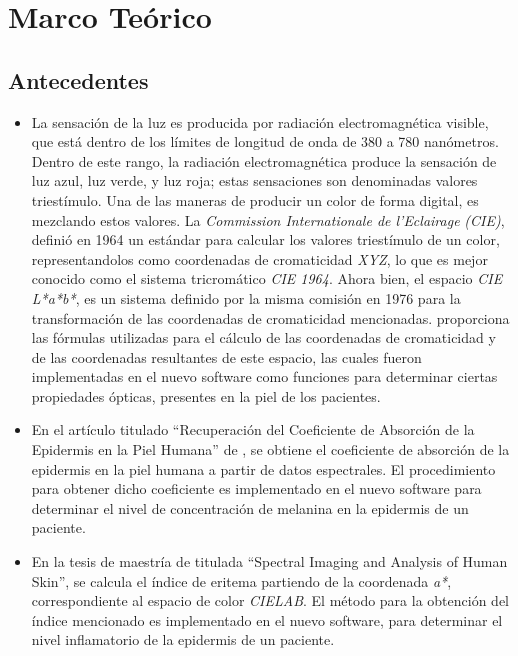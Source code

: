 \chapter{\label{cap:2}Marco Te\'{o}rico}

	\section{Antecedentes}	
		\begin{itemize}
		
			\item
				La sensaci\'{o}n de la luz es producida por radiaci\'{o}n electromagn\'{e}tica visible, que est\'{a} dentro de los l\'{i}mites de longitud de onda de 380 a 780 nan\'{o}metros. Dentro de este rango, la radiaci\'{o}n electromagn\'{e}tica produce la sensaci\'{o}n de luz azul, luz verde, y luz roja; estas sensaciones son denominadas valores triest\'{i}mulo. Una de las maneras de producir un color de forma digital, es mezclando estos valores. La \textit{\mbox{Commission} Internationale de l'Eclairage} \textit{(CIE)}, defini\'{o} en 1964 un est\'{a}ndar para calcular los valores triest\'{i}mulo de un color, representandolos como coordenadas de cromaticidad \textit{XYZ}, lo que es mejor conocido como el sistema tricrom\'{a}tico \textit{CIE 1964}. Ahora bien, el espacio \textit{CIE L*a*b*}, es un sistema definido por la misma comisi\'{o}n en 1976 para la \mbox{transformaci\'{o}n} de las coordenadas de cromaticidad mencionadas. \cite{Schanda} proporciona las f\'{o}rmulas utilizadas para el c\'{a}lculo de las coordenadas de cromaticidad y de las coordenadas resultantes de este espacio, las cuales fueron implementadas en el nuevo software como funciones para determinar ciertas propiedades \'{o}pticas, presentes en la piel de los pacientes.
			
			\item En el art\'{i}culo titulado ``Recuperaci\'{o}n del Coeficiente de Absorci\'{o}n de la Epidermis en la Piel Humana'' de \cite{Narea}, se obtiene el coeficiente de absorci\'{o}n de la epidermis en la piel humana a partir de datos espectrales. El procedimiento para obtener dicho coeficiente es implementado en el nuevo software para determinar el nivel de concentraci\'{o}n de melanina en la epidermis de un paciente.
			
			\item En la tesis de maestr\'{i}a de \cite{Bersha} titulada ``Spectral Imaging and Analysis of Human Skin'', se calcula el \'{i}ndice de eritema partiendo de la coordenada \textit{a*}, correspondiente al espacio de color \textit{CIELAB}. El m\'{e}todo para la obtenci\'{o}n del \'{i}ndice mencionado es implementado en el nuevo software, para determinar el nivel inflamatorio de la epidermis de un paciente.
		\end{itemize}

